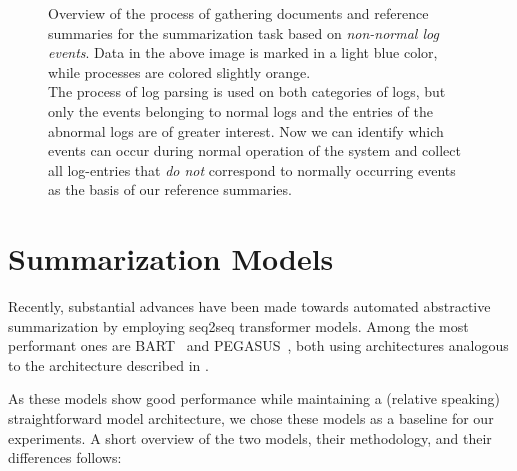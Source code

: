 \begin{figure}[ph]
{
}
\caption[Overview of the process of gathering documents and reference summaries for the summarization task based on \emph{non-normal log events}.]{
Overview of the process of gathering documents and reference summaries for the summarization task based on \emph{non-normal log events}.
Data in the above image is marked in a light blue color, while processes are colored slightly orange.\\
The process of log parsing is used on both categories of logs,
but only the events belonging to normal logs and the entries of the abnormal logs are of greater interest.
Now we can identify which events can occur during normal operation of the system and
collect all log-entries that \emph{do not} correspond to normally occurring events as the basis of our reference summaries.}
\label{fig:non_normal_log_events_summarization_overview}
\end{figure}

\section{Summarization Models}\label{sec:summary_models}

Recently, substantial advances have been made towards automated abstractive summarization
by employing \ac{seq2seq} transformer models.
Among the most performant ones are BART~\parencite{bart} and PEGASUS~\parencite{pegasus},
both using architectures analogous to the architecture described in \parencite{transformer}.

As these models show good performance while maintaining a (relative speaking) straightforward model architecture,
we chose these models as a baseline for our experiments.
A short overview of the two models, their methodology, and their differences follows:

